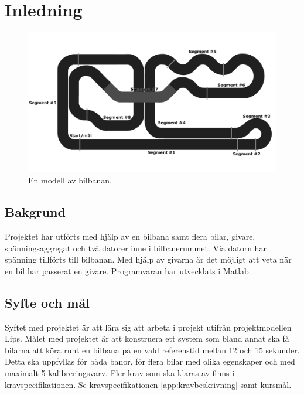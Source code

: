 \section{Inledning}

\begin{figure}
	\centering
	\includegraphics[width=\linewidth] {Figures/BanaModell}
	\caption{En modell av bilbanan.}
	\label{fig:bilbanan}
\end{figure}

\subsection{Bakgrund} Projektet har utförts med hjälp av en bilbana samt
flera bilar, givare, spänningsaggregat och två datorer inne i bilbanerummet. Via datorn har spänning tillförts till bilbanan. Med hjälp av givarna är
det möjligt att veta när en bil har passerat en givare.  Programvaran har utvecklats
i Matlab.

\subsection{Syfte och mål}

Syftet med projektet är att lära sig att arbeta i projekt utifrån
projektmodellen Lips. Målet med projektet är att konstruera ett system som bland
annat ska få bilarna att köra runt en bilbana på en vald referenstid mellan 12
och 15 sekunder. Detta ska uppfyllas för båda banor, för flera bilar med olika
egenskaper och med maximalt 5 kalibreringsvarv. Fler krav som ska klaras av
finns i kravspecifikationen. Se kravspecifikationen \ref{app:kravbeskrivning}
samt kursmål.

